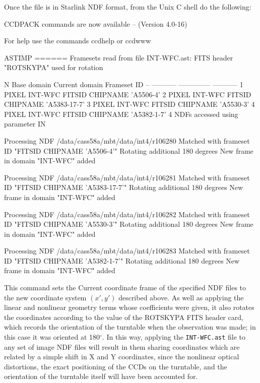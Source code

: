 \documentclass[twoside,11pt]{starlink}
\begin{document}
Once the file is in Starlink NDF format,
from the Unix C shell do the following:
\begin{terminalv}

   CCDPACK commands are now available -- (Version 4.0-16)

  For help use the commands ccdhelp or ccdwww


    ASTIMP
    ======
  Framesets read from file INT-WFC.ast:
    FITS header "ROTSKYPA" used for rotation

     N    Base domain         Current domain      Frameset ID
     --   -----------         --------------      -----------
     1    PIXEL               INT-WFC             FITSID CHIPNAME 'A5506-4'
     2    PIXEL               INT-WFC             FITSID CHIPNAME 'A5383-17-7'
     3    PIXEL               INT-WFC             FITSID CHIPNAME 'A5530-3'
     4    PIXEL               INT-WFC             FITSID CHIPNAME 'A5382-1-7'
  4 NDFs accessed using parameter IN

  Processing NDF /data/cass58a/mbt/data/int4/r106280
    Matched with frameset ID "FITSID CHIPNAME 'A5506-4'"
    Rotating additional 180 degrees
    New frame in domain "INT-WFC" added

  Processing NDF /data/cass58a/mbt/data/int4/r106281
    Matched with frameset ID "FITSID CHIPNAME 'A5383-17-7'"
    Rotating additional 180 degrees
    New frame in domain "INT-WFC" added

  Processing NDF /data/cass58a/mbt/data/int4/r106282
    Matched with frameset ID "FITSID CHIPNAME 'A5530-3'"
    Rotating additional 180 degrees
    New frame in domain "INT-WFC" added

  Processing NDF /data/cass58a/mbt/data/int4/r106283
    Matched with frameset ID "FITSID CHIPNAME 'A5382-1-7'"
    Rotating additional 180 degrees
    New frame in domain "INT-WFC" added
\end{terminalv}
This command sets the Current coordinate frame of the specified
NDF files to the new coordinate system $(x',y')$ described above.
As well as applying the linear and nonlinear geometry terms whose
coefficients were given,
it also rotates the coordinates according to the value of the
ROTSKYPA FITS header card, which records the orientation of the
turntable when the observation was made;
in this case it was oriented at 180$^\circ$.
In this way, applying the \texttt{INT-WFC.ast} file to any set of
image NDF files will result in them sharing coordinates which
are related by a simple shift in X and Y coordinates,
since the nonlinear optical distortions,
the exact positioning of the CCDs on the turntable,
and the orientation of the turntable itself will have been
accounted for.
\end{document}
